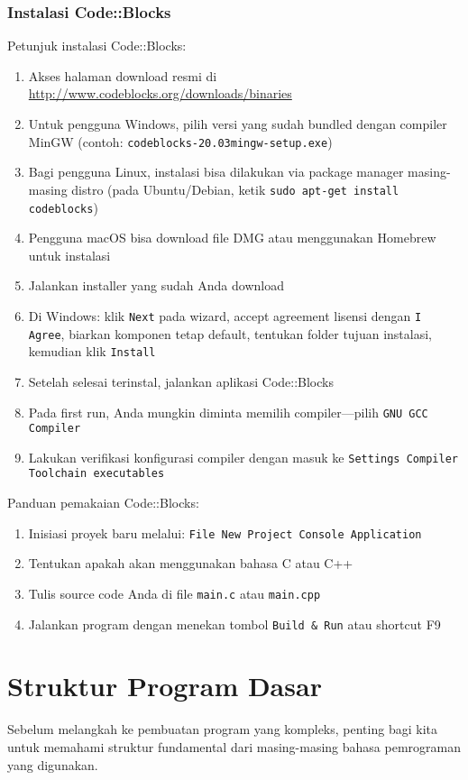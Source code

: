 \documentclass[../main.tex]{subfiles}
\begin{document}
\subsubsection{Instalasi Code::Blocks}
Petunjuk instalasi Code::Blocks:
\begin{enumerate}
  \item Akses halaman download resmi di \url{http://www.codeblocks.org/downloads/binaries}
  \item Untuk pengguna Windows, pilih versi yang sudah bundled dengan compiler MinGW (contoh: \texttt{codeblocks-20.03mingw-setup.exe})
  \item Bagi pengguna Linux, instalasi bisa dilakukan via package manager masing-masing distro (pada Ubuntu/Debian, ketik \texttt{sudo apt-get install codeblocks})
  \item Pengguna macOS bisa download file DMG atau menggunakan Homebrew untuk instalasi
  \item Jalankan installer yang sudah Anda download
  \item Di Windows: klik \texttt{Next} pada wizard, accept agreement lisensi dengan \texttt{I Agree}, biarkan komponen tetap default, tentukan folder tujuan instalasi, kemudian klik \texttt{Install}
  \item Setelah selesai terinstal, jalankan aplikasi Code::Blocks
  \item Pada first run, Anda mungkin diminta memilih compiler—pilih \texttt{GNU GCC Compiler}
  \item Lakukan verifikasi konfigurasi compiler dengan masuk ke \texttt{Settings \textrightarrow{} Compiler \textrightarrow{} Toolchain executables}
\end{enumerate}

Panduan pemakaian Code::Blocks:
\begin{enumerate}
  \item Inisiasi proyek baru melalui: \texttt{File \textrightarrow{} New \textrightarrow{} Project \textrightarrow{} Console Application}
  \item Tentukan apakah akan menggunakan bahasa C atau C++
  \item Tulis source code Anda di file \texttt{main.c} atau \texttt{main.cpp}
  \item Jalankan program dengan menekan tombol \texttt{Build \& Run} atau shortcut F9
\end{enumerate}

\section{Struktur Program Dasar}
Sebelum melangkah ke pembuatan program yang kompleks, penting bagi kita untuk memahami struktur fundamental dari masing-masing bahasa pemrograman yang digunakan.
\end{document}
